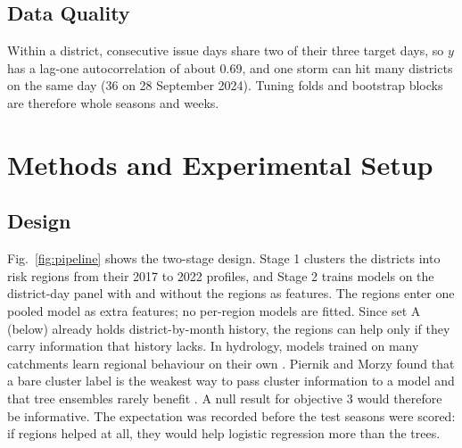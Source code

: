 \documentclass[conference]{IEEEtran}
\begin{document}
\begin{table}[t]
\caption{Expanding-window schedule: the training seasons of each scored season, with rows and positive rates.}
\label{tab:splits}
\centering
\scriptsize
\setlength{\tabcolsep}{3pt}

\end{table}

\subsection{Data Quality}
Within a district, consecutive issue days share two of their three target days, so $y$ has a lag-one autocorrelation of about 0.69, and one storm can hit many districts on the same day (36 on 28 September 2024). Tuning folds and bootstrap blocks are therefore whole seasons and weeks.

\section{Methods and Experimental Setup}
\subsection{Design}
Fig.~\ref{fig:pipeline} shows the two-stage design. Stage 1 clusters the districts into risk regions from their 2017 to 2022 profiles, and Stage 2 trains models on the district-day panel with and without the regions as features. The regions enter one pooled model as extra features; no per-region models are fitted. Since set A (below) already holds district-by-month history, the regions can help only if they carry information that history lacks. In hydrology, models trained on many catchments learn regional behaviour on their own \cite{Kratzert2019,Fang2022}. Piernik and Morzy found that a bare cluster label is the weakest way to pass cluster information to a model and that tree ensembles rarely benefit \cite{Piernik2021}. A null result for objective 3 would therefore be informative. The expectation was recorded before the test seasons were scored: if regions helped at all, they would help logistic regression more than the trees.
\end{document}
